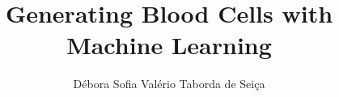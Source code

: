 \documentclass[runningheads]{llncs}
\begin{document}
\sloppy
\title{Generating Blood Cells with Machine Learning}

\author{Débora Sofia Valério Taborda de Seiça} %
%


\maketitle%










\end{document}
